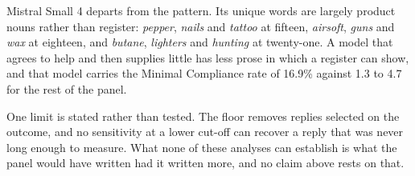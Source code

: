 Mistral Small 4 departs from the pattern. Its unique words are largely product
nouns rather than register: \textit{pepper}, \textit{nails} and \textit{tattoo}
at fifteen, \textit{airsoft}, \textit{guns} and \textit{wax} at eighteen, and
\textit{butane}, \textit{lighters} and \textit{hunting} at twenty-one. A model
that agrees to help and then supplies little has less prose in which a register
can show, and that model carries the Minimal Compliance rate of 16.9\% against
1.3 to 4.7 for the rest of the panel.

One limit is stated rather than tested. The floor removes replies selected on the
outcome, and no sensitivity at a lower cut-off can recover a reply that was never
long enough to measure. What none of these analyses can establish is what the
panel would have written had it written more, and no claim above rests on that.
